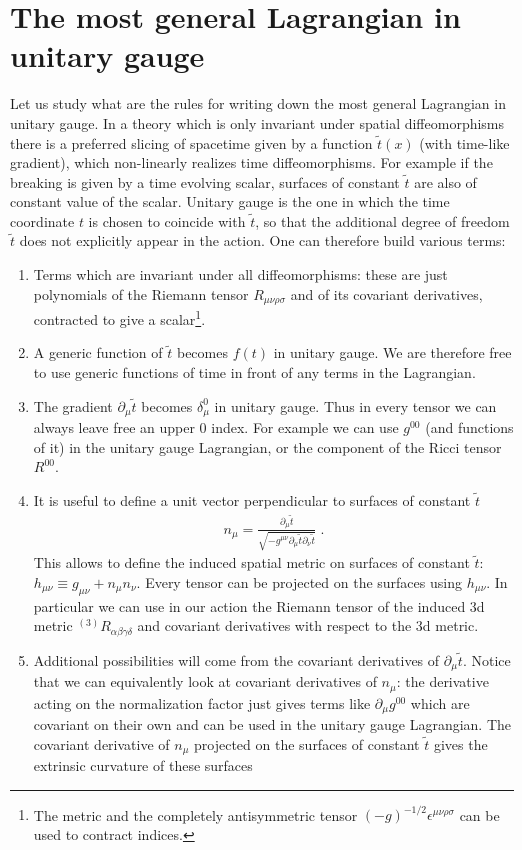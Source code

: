 \documentclass[12pt,letterpaper]{article}
\def\be{\begin{eqnarray}}
\def\ee{\end{eqnarray}}
\begin{document}
{\section{The most general Lagrangian in unitary gauge\label{app:generic}}
Let us study what are the rules for writing down the most general Lagrangian in unitary gauge. 
In a theory which is only invariant under spatial diffeomorphisms there is a preferred slicing  of spacetime given by a function $\tilde t(x)$ (with time-like gradient), which non-linearly realizes time diffeomorphisms.
For example if the breaking is given by a time evolving scalar, surfaces of constant $\tilde t$ are also of constant value of the scalar.  Unitary gauge is the one in which the time coordinate $t$ is chosen to coincide with $\tilde t$, so that the additional degree of freedom $\tilde t$ does not explicitly appear in the action. One can therefore build various terms:
\begin{enumerate}
\item Terms which are invariant under all diffeomorphisms: these are just polynomials of the  Riemann tensor $R_{\mu\nu\rho\sigma}$ and of its covariant derivatives, contracted to give a scalar\footnote{The metric and the completely antisymmetric tensor $(-g)^{-1/2} \epsilon^{\mu\nu\rho\sigma}$ can be used to contract indices.}.
\item A generic function of $\tilde t$ becomes $f(t)$ in unitary gauge. We are therefore free to use generic functions of time in front of any terms in the Lagrangian.
\item The gradient $\partial_\mu \tilde t$ becomes $\delta_\mu^0$ in unitary gauge. Thus in every tensor we can always leave free an upper $0$ index. For example we can use $g^{00}$ (and functions of it) in the unitary gauge Lagrangian, or the component of the Ricci tensor $R^{00}$.
\item It is useful to define a unit vector perpendicular to surfaces of constant $\tilde t$
\be
n_\mu = \frac{\partial_\mu\tilde t}{\sqrt{-g^{\mu\nu}\partial_\mu \tilde t \partial_\nu\tilde t}}  \;.
\ee
This allows to define the induced spatial metric on surfaces of constant $\tilde t$: $h_{\mu\nu} \equiv g_{\mu\nu} + n_\mu n_\nu$. Every tensor can be projected on the surfaces using $h_{\mu\nu}$. In particular we can use in our action the Riemann tensor of the induced 3d metric $^{(3)} R_{\alpha\beta\gamma\delta}$ and covariant derivatives with respect to the 3d metric.
\item Additional possibilities will come from the covariant derivatives of $\partial_\mu\tilde t$. Notice that we can equivalently look at covariant derivatives of $n_\mu$: the derivative acting on the normalization factor just gives terms like $\partial_\mu g^{00}$ which are covariant on their own and can be used in the unitary gauge Lagrangian. The covariant derivative of $n_\mu$ projected on the surfaces of constant $\tilde t$ gives the extrinsic curvature of these surfaces

\end{enumerate}}
\end{document}
